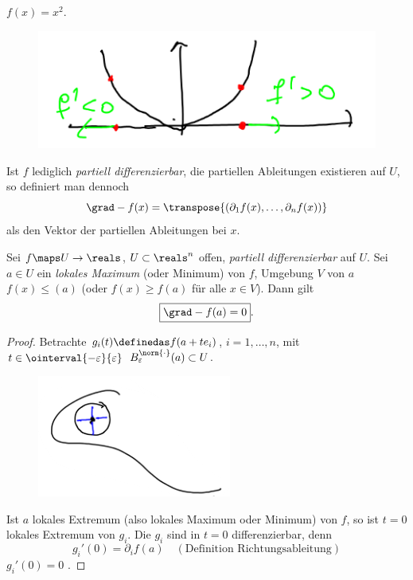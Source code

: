 \begin{beispiel*}
    \( f(x)=x^2 \).
    \begin{figure}[H]
        \centering
        \includegraphics[width=0.4\linewidth]{figures/gradient_beispiel_parabel_2d}
        \caption*{}
        \label{fig:gradient_beispiel_parabel_2d}
    \end{figure}
    Ist \( f \) lediglich \emph{partiell differenzierbar}, \dh  die partiellen Ableitungen existieren auf \( U \), so definiert man dennoch
    \begin{equation*}
        \grad-{f(x)}=\transpose{(\partial_1 f(x),\dotsc, \partial_n f(x))}
    \end{equation*}
    als den Vektor der partiellen Ableitungen bei \( x \).
\end{beispiel*}
\begin{satz}\label{extremum_notwendige_bedingung}
    Sei \( f\maps U\to \reals \), \( U\subset \reals^n \) offen, \emph{partiell differenzierbar} auf \( U \). Sei \( a\in U \) ein \emph{lokales Maximum} (oder Minimum) von \( f \), \dh  \texists Umgebung \( V \) von \( a \) \sd \( f(x)\leq (a) \) (oder \( f(x)\geq f(a) \) für alle \( x\in V \)). Dann gilt
    \begin{equation*}
        \boxed{\grad-{f(a)}=0}.
    \end{equation*} 
\end{satz}
\begin{proof}
    Betrachte \( g_i(t)\definedas f(a+t e_i) \), \( i=1,\dotsc, n \), mit \( t\in \ointerval{-\varepsilon}{\varepsilon} \) \sd \( B_{\varepsilon}^{\norm{\cdot}}(a)\subset U \).
    \begin{figure}[H]
        \centering
        \includegraphics[width=0.5\linewidth]{figures/extrema_notwendige_bedingung_beweis_umgebung}
        \label{fig:extrema_notwendige_bedingung_beweis_umgebung}
    \end{figure}
    Ist \( a \) lokales Extremum (also lokales Maximum oder Minimum) von \( f\), so ist \( t=0 \) lokales Extremum von \( g_i \). Die \( g_i \) sind in \( t=0 \) differenzierbar, denn
    \begin{equation*}
        g_i'(0)=\partial_i f(a)\quad (\text{Definition Richtungsableitung})
    \end{equation*}
     \timplies \( g_i'(0)=0 \) \timplies \Beh.
\end{proof}
